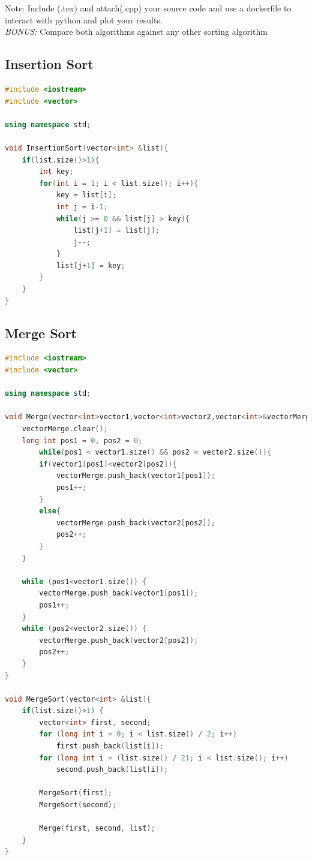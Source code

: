 \documentclass[12pt]{article}
\begin{document}
Note: Include (.tex) and attach(.cpp) your source code and use a dockerfile to interact with python and plot your results.\\

\emph{BONUS:} Compare both algorithms against any other sorting algorithm

\subsection{Insertion Sort}
\begin{lstlisting}[language=C++]
#include <iostream>
#include <vector>

using namespace std;

void InsertionSort(vector<int> &list){
    if(list.size()>1){
        int key;
        for(int i = 1; i < list.size(); i++){
            key = list[i];
            int j = i-1;
            while(j >= 0 && list[j] > key){
                list[j+1] = list[j];
                j--;
            }
            list[j+1] = key;
        }
    }
}
\end{lstlisting}

\subsection{Merge Sort}

\begin{lstlisting}[language=C++]
#include <iostream>
#include <vector>

using namespace std;

void Merge(vector<int>vector1,vector<int>vector2,vector<int>&vectorMerge){
    vectorMerge.clear();
    long int pos1 = 0, pos2 = 0;
        while(pos1 < vector1.size() && pos2 < vector2.size()){
        if(vector1[pos1]<vector2[pos2]){
            vectorMerge.push_back(vector1[pos1]);
            pos1++;
        }
        else{
            vectorMerge.push_back(vector2[pos2]);
            pos2++;
        }
    }

    while (pos1<vector1.size()) {
        vectorMerge.push_back(vector1[pos1]);
        pos1++;
    }
    while (pos2<vector2.size()) {
        vectorMerge.push_back(vector2[pos2]);
        pos2++;
    }
}

void MergeSort(vector<int> &list){
    if(list.size()>1) {
        vector<int> first, second;
        for (long int i = 0; i < list.size() / 2; i++)
            first.push_back(list[i]);
        for (long int i = (list.size() / 2); i < list.size(); i++)
            second.push_back(list[i]);

        MergeSort(first);
        MergeSort(second);

        Merge(first, second, list);
    }
}
\end{lstlisting}
\end{document}

